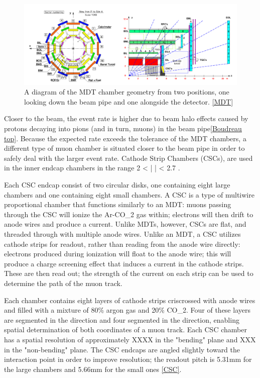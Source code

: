 \begin{figure}
  \includegraphics[width=\linewidth]{figures/detector_chapter/MDTChamber.png}
  \caption{A diagram of the MDT chamber geometry from two positions, one looking down the beam pipe and one alongside the detector. \ref{MDT}}
  \label{fig:MDTChamber}
\end{figure}

Closer to the beam, the event rate is higher due to beam halo effects caused by protons decaying into pions (and in turn, muons) in the beam pipe\ref{Boudreau top}. Because the expected rate exceeds the tolerance of the MDT chambers, a different type of muon chamber is situated closer to the beam pipe in order to safely deal with the larger event rate. Cathode Strip Chambers (CSCs), are used in the inner endcap chambers in the range 2 < | \eta | < 2.7 .

Each CSC endcap consist of two circular disks, one containing eight large chambers and one containing eight small chambers. A CSC is a type of multiwire proportional chamber that functions similarly to an MDT: muons passing through the CSC will ionize the Ar-CO_2 gas within; electrons will then drift to anode wires and produce a current. Unlike MDTs, however, CSCs are flat, and threaded through with multiple anode wires. Unlike an MDT, a CSC utilizes cathode strips for readout, rather than reading from the anode wire directly: electrons produced during ionization will float to the anode wire; this will produce a charge screening effect that induces a current in the cathode strips. These are then read out; the strength of the current on each strip can be used to determine the path of the muon track.

Each chamber contains eight layers of cathode strips criscrossed with anode wires and filled with a mixture of 80\% argon gas and 20\% CO_2. Four of these layers are segmented in the \eta direction and four segmented in the \phi direction, enabling spatial determination of both coordinates of a muon track. Each CSC chamber has a spatial resolution of approximately XXXX in the "bending" \eta plane and XXX in the "non-bending" \phi plane. The CSC endcaps are angled slightly toward the interaction point in order to improve resolution; the readout pitch is 5.31mm for the large chambers and 5.66mm for the small ones \ref{CSC}.

